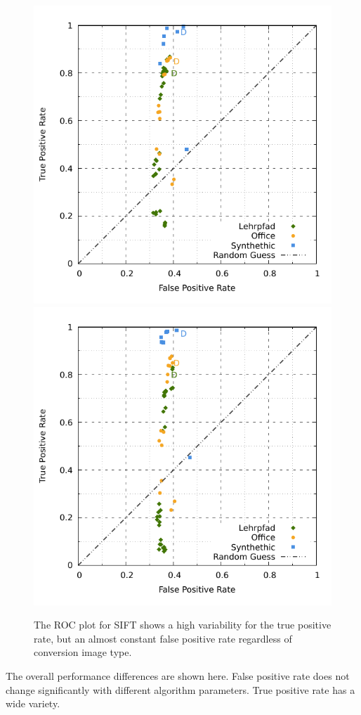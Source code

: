 \begin{figure}[H]
    \includegraphics[width=0.48\linewidth]{chapter06/results/SIFT/flexion/roc.pdf}%
    \includegraphics[width=0.48\linewidth]{chapter06/results/SIFT/bearing/roc.pdf}
    \caption{The ROC plot for SIFT shows a high variability for the true positive rate, but an almost constant false positive rate regardless of conversion image type.}
\end{figure}
The overall performance differences are shown here.
False positive rate does not change significantly with different algorithm parameters.
True positive rate has a wide variety.

